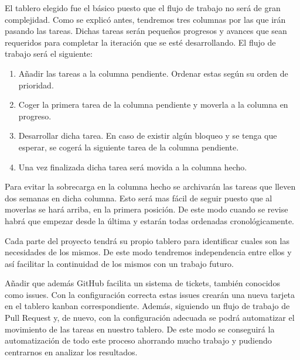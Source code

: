 El tablero elegido fue el básico puesto que el flujo de trabajo no será de gran complejidad.
Como se explicó antes, tendremos tres columnas por las que irán pasando las tareas. Dichas
tareas serán pequeños progresos y avances que sean requeridos para completar la iteración
que se esté desarrollando. El flujo de trabajo será el siguiente:

\begin{enumerate}
  \item Añadir las tareas a la columna pendiente. Ordenar estas según su orden de prioridad.
  \item Coger la primera tarea de la columna pendiente y moverla a la columna en progreso.
  \item Desarrollar dicha tarea. En caso de existir algún bloqueo y se tenga que esperar,
    se cogerá la siguiente tarea de la columna pendiente.
  \item Una vez finalizada dicha tarea será movida a la columna hecho.
\end{enumerate}

Para evitar la sobrecarga en la columna hecho se archivarán las tareas que lleven dos semanas
en dicha columna. Esto será mas fácil de seguir puesto que al moverlas se hará arriba, en la primera
posición. De este modo cuando se revise habrá que empezar desde la última y estarán todas
ordenadas cronológicamente.

Cada parte del proyecto tendrá su propio tablero para identificar cuales son las necesidades de los mismos.
De este modo tendremos independencia entre ellos y así facilitar la continuidad de los mismos
con un trabajo futuro.

Añadir que además GitHub facilita un sistema de tickets, también conocidos como issues. Con la
configuración correcta estas issues crearán una nueva tarjeta en el tablero kanban correspondiente.
Además, siguiendo un flujo de trabajo de Pull Request y, de nuevo, con la configuración adecuada se
podrá automatizar el movimiento de las tareas en nuestro tablero. De este modo se conseguirá la
automatización de todo este proceso ahorrando mucho trabajo y pudiendo centrarnos en analizar los
resultados.
